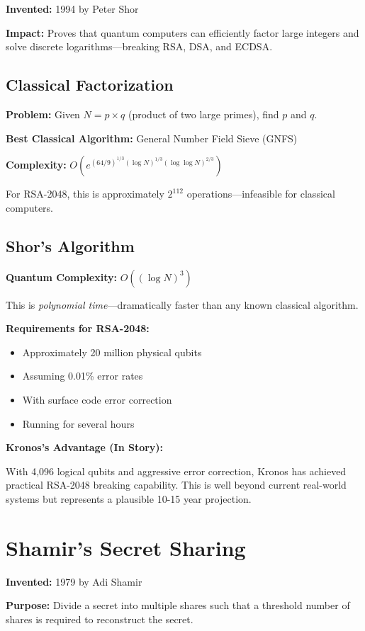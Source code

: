 \documentclass[12pt,oneside]{book}
\begin{document}
\textbf{Invented:} 1994 by Peter Shor

\textbf{Impact:} Proves that quantum computers can efficiently factor large integers and solve discrete logarithms—breaking RSA, DSA, and ECDSA.

\subsection{Classical Factorization}

\textbf{Problem:} Given $N = p \times q$ (product of two large primes), find $p$ and $q$.

\textbf{Best Classical Algorithm:} General Number Field Sieve (GNFS)

\textbf{Complexity:} $O(e^{(64/9)^{1/3} (\log N)^{1/3} (\log \log N)^{2/3}})$

For RSA-2048, this is approximately $2^{112}$ operations—infeasible for classical computers.

\subsection{Shor's Algorithm}

\textbf{Quantum Complexity:} $O((\log N)^3)$

This is \textit{polynomial time}—dramatically faster than any known classical algorithm.

\textbf{Requirements for RSA-2048:}
\begin{itemize}
\item Approximately 20 million physical qubits
\item Assuming 0.01\% error rates
\item With surface code error correction
\item Running for several hours
\end{itemize}

\textbf{Kronos's Advantage (In Story):}

With 4,096 logical qubits and aggressive error correction, Kronos has achieved practical RSA-2048 breaking capability. This is well beyond current real-world systems but represents a plausible 10-15 year projection.

\section{Shamir's Secret Sharing}

\textbf{Invented:} 1979 by Adi Shamir

\textbf{Purpose:} Divide a secret into multiple shares such that a threshold number of shares is required to reconstruct the secret.
\end{document}

